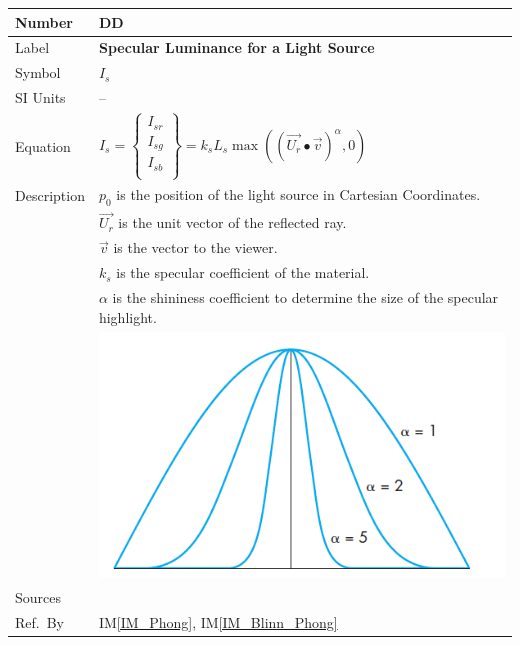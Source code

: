 \documentclass[12pt]{article}
\newcommand{\colAwidth}{0.13\textwidth}
\newcommand{\colBwidth}{0.82\textwidth}
\newcounter{defnum} %
\newcounter{datadefnum} %
\newcommand{\iref}[1]{IM\ref{#1}}
\begin{document}
\noindent
\begin{minipage}{\textwidth}
	\renewcommand*{\arraystretch}{1.5}
	\begin{tabular}{| p{\colAwidth} | p{\colBwidth}|}
		\hline
		\rowcolor[gray]{0.9}
		Number& DD{datadefnum}\thedatadefnum 
		\label{DD_Intensity_specular}\\
		\hline
		Label& \bf Specular Luminance for a Light Source\\
		\hline
		Symbol &$I_{s}$\\
		\hline
		SI Units & --\\
		\hline
		Equation&$I_{s} = \begin{Bmatrix}
		I_{sr} \\ I_{sg} \\ I_{sb} \\
		\end{Bmatrix} = k_{s}L_{s}\max((\vec{U_{r}}\bullet \vec{v})^\alpha, 0)
		$ \\
		\hline
		Description & $p_{0}$ is the position of the light source in Cartesian 
		Coordinates.
		\\
		& $\vec{U_{r}}$ is the unit vector of the reflected ray.\\
		& $\vec{v}$ is the vector to the viewer.\\
		& $k_{s}$ is the specular coefficient of the material.\\
		& $\alpha$ is the shininess coefficient to determine the size of the 
		specular highlight.\\
		& \includegraphics[]{./images/shininess-coefficient}\\
		\hline
		Sources& \cite{shreiner2012}\\
		\hline
		Ref.\ By & \iref{IM_Phong}, \iref{IM_Blinn_Phong}\\
		\hline
	\end{tabular}
\end{minipage}\\
\end{document}

